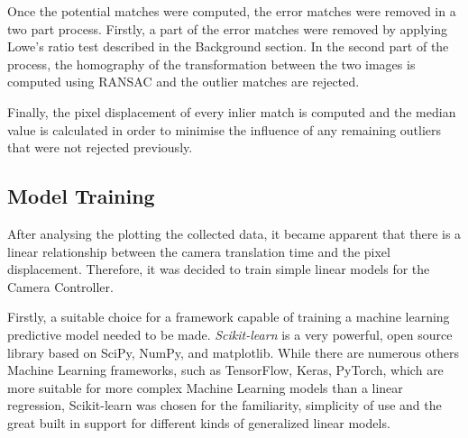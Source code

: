 \documentclass{l4proj}
\begin{document}
Once the potential matches were computed, the error matches were removed in a two part process. Firstly, a part of the error matches were removed by applying Lowe's ratio test described in the Background section. In the second part of the process, the homography of the transformation between the two images is computed using RANSAC and the outlier matches are rejected. 

Finally, the pixel displacement of every inlier match is computed and the median value is calculated in order to minimise the influence of any remaining outliers that were not rejected previously.  


\subsection{Model Training}

After analysing the plotting the collected data, it became apparent that there is a linear relationship between the camera translation time and the pixel displacement. Therefore, it was decided to train simple linear models for the Camera Controller. 

Firstly, a suitable choice for a framework capable of training a machine learning predictive model needed to be made. \textit{Scikit-learn} is a very powerful, open source library based on SciPy, NumPy, and matplotlib. While there are numerous others Machine Learning frameworks, such as TensorFlow, Keras, PyTorch, which are more suitable for more complex Machine Learning models than a linear regression, Scikit-learn was chosen for the familiarity, simplicity of use and the great built in support for different kinds of generalized linear models.
\end{document}
